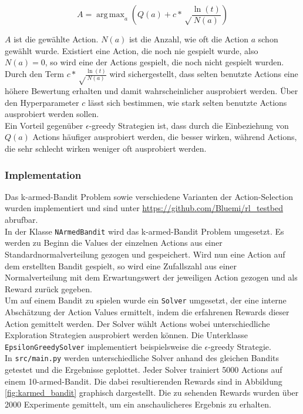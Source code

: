 \documentclass[11pt]{scrartcl}
\DeclareMathOperator*{\argmax}{arg\,max}
\begin{document}
\[ A = \argmax_a\left( Q(a) + c*\sqrt\frac{\ln(t)}{N(a)} \right) \]

\noindent
$A$ ist die gewählte Action. $N(a)$ ist die Anzahl, wie oft die Action $a$ schon gewählt
wurde. Existiert eine Action, die noch nie gespielt wurde, also $N(a)=0$, so wird eine der
Actions gespielt, die noch nicht gespielt wurden. Durch den Term
$c*\sqrt\frac{\ln(t)}{N(a)}$ wird sichergestellt, dass selten benutzte Actions eine höhere
Bewertung erhalten und damit wahrscheinlicher ausprobiert werden. Über den Hyperparameter
$c$ lässt sich bestimmen, wie stark selten benutzte Actions ausprobiert werden sollen.\\
Ein Vorteil gegenüber $\epsilon$-greedy Strategien ist, dass durch die Einbeziehung von
$Q(a)$ Actions häufiger ausprobiert werden, die besser wirken, während Actions, die sehr
schlecht wirken weniger oft ausprobiert werden.

\subsubsection{Implementation}
Das k-armed-Bandit Problem sowie verschiedene Varianten der Action-Selection wurden
implementiert und sind unter \url{https://github.com/Bluemi/rl_testbed} abrufbar.\\
In der Klasse \lstinline!NArmedBandit! wird das k-armed-Bandit Problem umgesetzt. Es
werden zu Beginn die Values der einzelnen Actions aus einer Standardnormalverteilung
gezogen und gespeichert. Wird nun eine Action auf dem erstellten Bandit gespielt, so wird
eine Zufallszahl aus einer Normalverteilung mit dem Erwartungswert der jeweiligen Action
gezogen und als Reward zurück gegeben.\\
Um auf einem Bandit zu spielen wurde ein \lstinline!Solver! umgesetzt, der eine interne
Abschät\-zung der Action Values ermittelt, indem die erfahrenen Rewards dieser Action
gemittelt werden. Der Solver wählt Actions wobei unterschiedliche Exploration Strategien
ausprobiert werden können. Die Unterklasse \lstinline!EpsilonGreedySolver! implementiert
beispielsweise die $\epsilon$-greedy Strategie.\\
In \lstinline!src/main.py! werden unterschiedliche Solver anhand des gleichen Bandits
getestet und die Ergebnisse geplottet. Jeder Solver trainiert 5000 Actions auf einem
10-armed-Bandit. Die dabei resultierenden Rewards sind in Abbildung
\ref{fig:karmed_bandit} graphisch dargestellt. Die zu sehenden Rewards wurden über 2000
Experimente gemittelt, um ein anschaulicheres Ergebnis zu erhalten.
\end{document}
